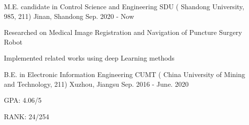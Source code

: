 

\begin{cventries}

  \cventry
    {M.E. candidate in Control Science and Engineering} %
    {SDU ( Shandong University, 985, 211)} %
    {Jinan, Shandong} %
    {Sep. 2020 - Now} %
    {
      \begin{cvitems} %
        \item {Researched on Medical Image Registration and Navigation of Puncture Surgery Robot}
        \item {Implemented related works using deep Learning methods}
      \end{cvitems}
    }

  \cventry
    {B.E. in Electronic Information Engineering} %
    {CUMT ( China University of Mining and Technology, 211)} %
    {Xuzhou, Jiangsu} %
    {Sep. 2016 - June. 2020} %
    {
      \begin{cvitems} %
        \item {GPA: 4.06/5}
        \item {RANK: 24/254}
      \end{cvitems}
    }

\end{cventries}
